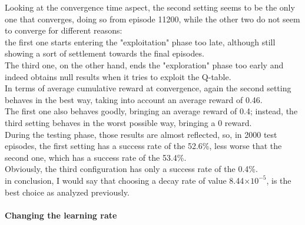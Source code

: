 \documentclass{article}
\begin{document}
\begin{center}
\centering
{}
\end{center}


Looking at the convergence time aspect, the second setting seems to be the only one that converges, doing so from episode 11200, while the other two do not seem to converge for different reasons:
\\
the first one starts entering the "exploitation" phase too late, although still showing a sort of settlement towards the final episodes.
\\
The third one, on the other hand, ends the "exploration" phase too early and indeed obtains null results when it tries to exploit the Q-table.
\\
In terms of average cumulative reward at convergence, again the second setting behaves in the best way, taking into account an average reward of 0.46.
\\
The first one also behaves goodly, bringing an average reward of 0.4; instead, the third setting behaves in the worst possible way, bringing a 0 reward.
\\
During the testing phase, those results are almost reflected, so, in 2000 test episodes, the first setting has a success rate of the 52.6\%, less worse that the second one, which has a success rate of the 53.4\%.
\\
Obviously, the third configuration has only a success rate of the 0.4\%.
\\
in conclusion, I would say that choosing a decay rate of value 8.44$\times10^{-5}$, is the best choice as analyzed previously.

\paragraph{Changing the learning rate}
\end{document}
